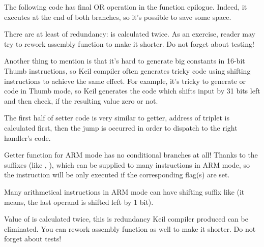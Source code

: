 

The following code has final OR operation in the function epilogue.
Indeed, it executes at the end of both branches, so it's possible to save some space.



There are at least of redundancy:  is calculated twice.
As an exercise, reader may try to rework assembly function to make it shorter. Do not forget about testing!

Another thing to mention is that it's hard to generate big constants in 16-bit Thumb instructions, so Keil compiler often generates
tricky code using shifting instructions to achieve the same effect.
For example, it's tricky to generate  or  code in Thumb mode, 
so Keil generates the code which shifts input  by 31 bits left and then check, if the resulting value zero or not.


The first half of setter code is very similar to getter, address of triplet is calculated first,
then the jump is occurred in order to dispatch to the right handler's code.





Getter function for ARM mode has no conditional branches at all!
Thanks to the suffixes (like , ), which can be supplied to many instructions in ARM mode,
so the instruction will be only executed if the corresponding flag(s) are set.

Many arithmetical instructions in ARM mode can have shifting suffix like 
(it means, the last operand is shifted left by 1 bit).






Value of  is calculated twice, this is redundancy Keil compiler produced can be eliminated.
You can rework assembly function as well to make it shorter. Do not forget about tests!

